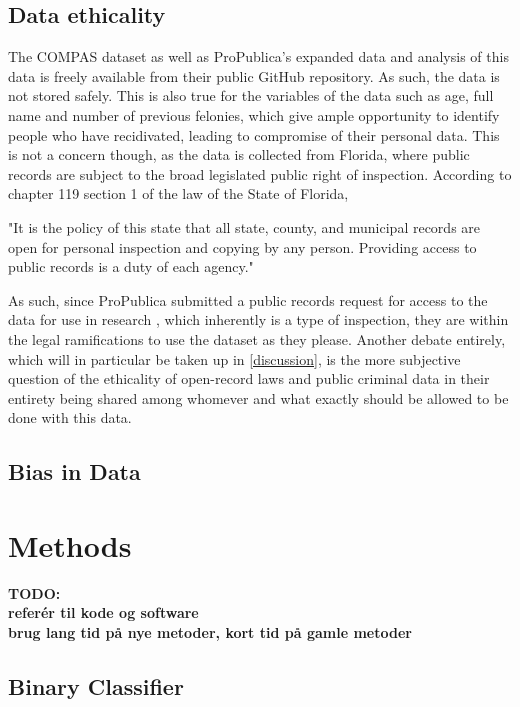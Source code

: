 \documentclass[11pt, fleqn, titlepage]{article}
\begin{document}
	\subsection{Data ethicality}
	The COMPAS dataset as well as ProPublica's expanded data and analysis of this data is freely available from their public GitHub repository. As such, the data is not stored safely. This is also true for the variables of the data such as age, full name and number of previous felonies, which give ample opportunity to identify people who have recidivated, leading to compromise of their personal data. This is not a concern though, as the data is collected from Florida, where public records are subject to the broad legislated public right of inspection. According to chapter 119 section 1 of the law of the State of Florida, 
	\begin{displayquote}
		"It is the policy of this state that all state, county, and municipal records are open for personal inspection and copying by any person. Providing access to public records is a duty of each agency." \cite{floridaLaw}
	\end{displayquote}
	
	\noindent As such, since ProPublica submitted a public records request for access to the data for use in research \cite{propublicaAnalysis}, which inherently is a type of inspection, they are within the legal ramifications to use the dataset as they please. Another debate entirely, which will in particular be taken up in \ref{discussion}, is the more subjective question of the ethicality of open-record laws and public criminal data in their entirety being shared among whomever and what exactly should be allowed to be done with this data.
	
	\subsection{Bias in Data}
	
	
	\section{Methods}
	\textbf{TODO: \\ referér til kode og software \\ brug lang tid på nye metoder, kort tid på gamle metoder}
	
	\subsection{Binary Classifier}\label{Feed-forward neural}
\end{document}
